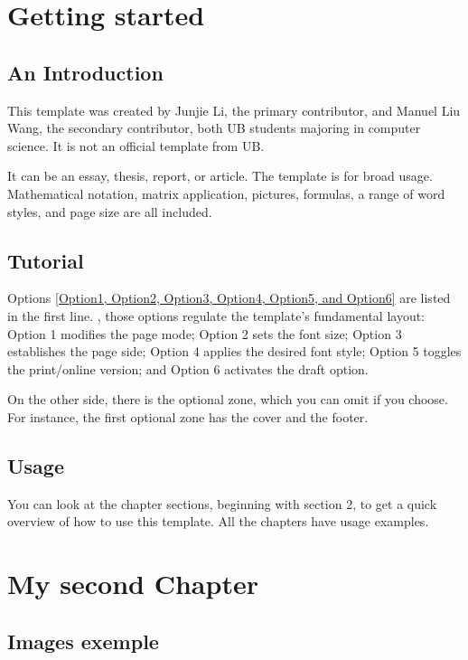 \chapter{Getting started}

\section{An Introduction}
This template was created by Junjie Li, the primary contributor, and Manuel Liu Wang, the secondary contributor, both UB students majoring in computer science. It is not an official template from UB.

It can be an essay, thesis, report, or article. The template is for broad usage. Mathematical notation, matrix application, pictures, formulas, a range of word styles, and page size are all included.


\section{Tutorial}
Options \underline{[Option1, Option2, Option3, Option4, Option5, and Option6]} are listed in the first line. , those options regulate the template's fundamental layout: Option 1 modifies the page mode; Option 2 sets the font size; Option 3 establishes the page side; Option 4 applies the desired font style; Option 5 toggles the print/online version; and Option 6 activates the draft option.

On the other side, there is the optional zone, which you can omit if you choose. For instance, the first optional zone has the cover and the footer.


\section{Usage}

You can look at the chapter sections, beginning with section 2, to get a quick overview of how to use this template. All the chapters have usage examples.    




\chapter{My second Chapter}

\section{Images exemple}


